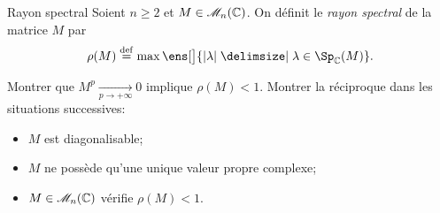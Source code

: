 \begin{defi}{Rayon spectral}
    Soient $n \geqslant 2$ et $M \in \mathscr{M}_n(\mathbb{C})$. On définit le \emph{rayon spectral} de la matrice $M$ par
    $$\rho(M) \defeq \max \ens[\big]{ |\lambda | \tq \lambda \in \Sp_{\C}(M) }.$$
\end{defi}

\begin{exercice}
    Montrer que $M^p \xrightarrow[p \to +\infty]{} 0$ implique $\rho(M) < 1$. Montrer la réciproque dans les situations successives:
    \begin{itemize}
        \item $M$ est diagonalisable;
        \item $M$ ne possède qu'une unique valeur propre complexe;
        \item $M \in \mathscr{M}_n(\mathbb{C})$ vérifie $\rho(M) < 1$.
    \end{itemize}
\end{exercice}                                    

